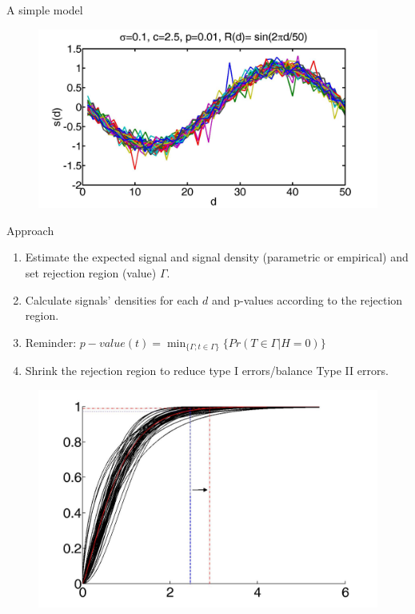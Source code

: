\documentclass[8pt]{beamer}
\begin{document}
\begin{frame}{A simple model}
\begin{figure}[H]
\includegraphics[scale=0.08]{sinSignalSample}
\end{figure}

\end{frame}

\begin{frame}{Approach}
\begin{enumerate}
\item Estimate the expected signal and signal density (parametric or empirical) and set rejection region (value) $\Gamma$.
\item Calculate signals' densities for each $d$ and p-values according to the rejection region.
\item Reminder: $p-value(t) = \min_{\{\Gamma;t\in\Gamma\}}\{Pr(T\in\Gamma |H=0)\}$
\item Shrink the rejection region to reduce type I errors/balance Type II errors.
\end{enumerate}

\begin{figure}[H]
\includegraphics[scale=0.15]{rejectionValueAdjastmentScheme}
\end{figure}
\end{frame}
\end{document}
